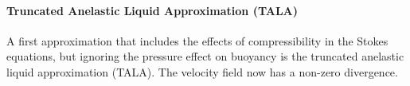 \paragraph{Truncated Anelastic Liquid Approximation (TALA)}
A first approximation that includes the effects of compressibility in the 
Stokes equations, but ignoring the pressure effect on buoyancy is the
truncated anelastic liquid approximation (TALA).  
The velocity field now has a non-zero
divergence. %
